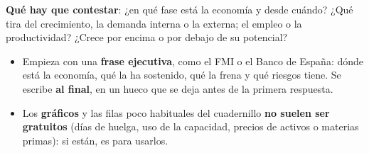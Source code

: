 \documentclass{article}
\begin{document}
\cabecerarepaso
\begin{columnas}


\begin{ideaclave}
\textbf{Qué hay que contestar}: ¿en qué fase está la economía y desde cuándo? ¿Qué tira del crecimiento, la demanda interna o la externa; el empleo o la productividad? ¿Crece por encima o por debajo de su potencial?
\end{ideaclave}
\begin{itemize}[itemsep=1.5pt]
\item Empieza con una \textbf{frase ejecutiva}, como el FMI o el Banco de España: dónde está la economía, qué la ha sostenido, qué la frena y qué riesgos tiene. Se escribe \textbf{al final}, en un hueco que se deja antes de la primera respuesta.
\item Los \textbf{gráficos} y las filas poco habituales del cuadernillo \textbf{no suelen ser gratuitos} (días de huelga, uso de la capacidad, precios de activos o materias primas): si están, es para usarlos.
\end{itemize}


\end{columnas}
\end{document}
